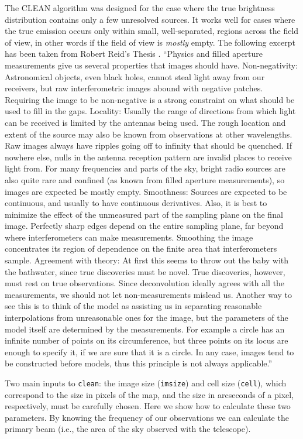 \documentclass[force,almostfull,justified]{tufte-book}
\begin{document}
The CLEAN algorithm was designed for the case where the true brightness distribution contains only a
few unresolved sources.  It works well for cases where the true emission occurs only within small,
well-separated, regions across the field of view, in other words if the field of view is {\em mostly}
empty.  The following excerpt has been taken from Robert Reid's Thesis \citep{Reid2003}.  ``Physics
and filled aperture measurements give us several properties that images should have. Non-negativity:
Astronomical objects, even black holes, cannot steal light away from our receivers, but raw
interferometric images abound with negative patches. Requiring the image to be non-negative is a
strong constraint on what should be used to fill in the gaps.  Locality: Usually the range of
directions from which light can be received is limited by the antennas being used. The rough location
and extent of the source may also be known from observations at other wavelengths. Raw images always
have ripples going off to infinity that should be quenched. If nowhere else, nulls in the antenna
reception pattern are invalid places to receive light from. For many frequencies and parts of the sky,
bright radio sources are also quite rare and confined (as known from filled aperture measurements), so
images are expected be mostly empty.  Smoothness: Sources are expected to be continuous, and usually
to have continuous derivatives. Also, it is best to minimize the effect of the unmeasured part of the
sampling plane on the final image. Perfectly sharp edges depend on the entire sampling plane, far
beyond where interferometers can make measurements. Smoothing the image concentrates its region of
dependence on the finite area that interferometers sample.  Agreement with theory: At first this seems
to throw out the baby with the bathwater, since true discoveries must be novel. True discoveries,
however, must rest on true observations. Since deconvolution ideally agrees with all the measurements,
we should not let non-measurements mislead us. Another way to see this is to think of the model as
assisting us in separating reasonable interpolations from unreasonable ones for the image, but the
parameters of the model itself are determined by the measurements. For example a circle has an
infinite number of points on its circumference, but three points on its locus are enough to specify
it, if we are sure that it is a circle. In any case, images tend to be constructed before models, thus
this principle is not always applicable.''

Two main inputs to {\tt clean}: the image size ({\tt imsize}) and cell size ({\tt cell}), which
correspond to the size in pixels of the map, and the size in arcseconds of a pixel, respectively, must
be carefully chosen. Here we show how to calculate these two parameters. By knowing the frequency of
our observations we can calculate the primary beam (i.e., the area of the sky observed with the
telescope).
\end{document}
